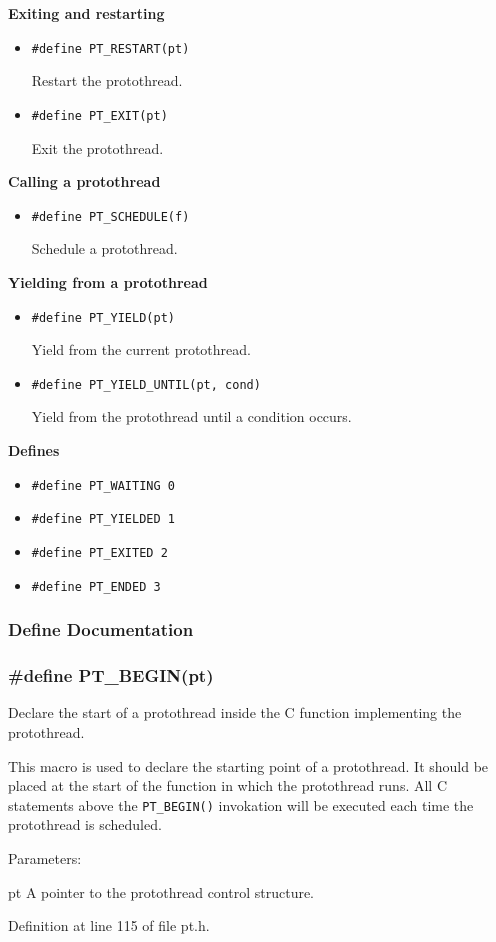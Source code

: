 \documentclass[12pt]{article}
\begin{document}
\begin{CJK}{UTF8}{bsmi}
\bf Exiting and restarting

\begin{itemize}
\item \verb+#define PT_RESTART(pt)+

Restart the protothread.

\item \verb+#define PT_EXIT(pt)+

Exit the protothread.
\end{itemize}

\bf Calling a protothread

\begin{itemize}
\item \verb+#define PT_SCHEDULE(f)+

Schedule a protothread.
\end{itemize}

\bf Yielding from a protothread

\begin{itemize}
\item \verb+#define PT_YIELD(pt)+

Yield from the current protothread.

\item \verb+#define PT_YIELD_UNTIL(pt, cond)+

Yield from the protothread until a condition occurs.
\end{itemize}

\bf Defines

\begin{itemize}
\item \verb+#define PT_WAITING 0+
\item \verb+#define PT_YIELDED 1+
\item \verb+#define PT_EXITED 2+
\item \verb+#define PT_ENDED 3+
\end{itemize}


\subsubsection{Define Documentation}

\subsubsection{\#define PT\_{}BEGIN(pt)}
Declare the start of a protothread inside the C function implementing the protothread.

This macro is used to declare the starting point of a protothread. It should be placed at the start of the function in which the protothread runs. All C statements above the \verb+PT_BEGIN()+ invokation will be executed each time the protothread is scheduled.


Parameters:

pt A pointer to the protothread control structure.

Definition at line 115 of file pt.h.


\end{CJK}
\end{document}
